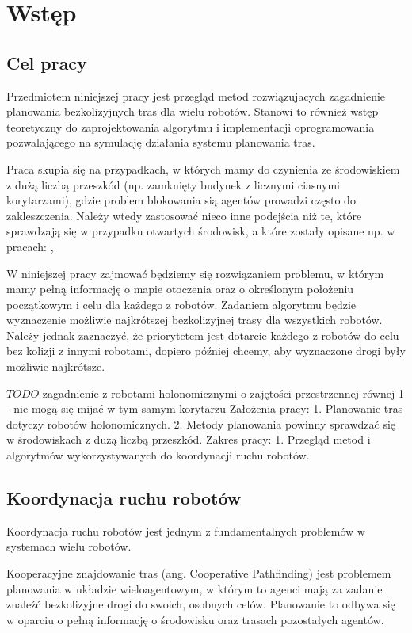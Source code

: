\chapter{Wstęp}
\label{ch:wstep}

\section{Cel pracy}
Przedmiotem niniejszej pracy jest przegląd metod rozwiązujacych zagadnienie planowania bezkolizyjnych tras dla wielu robotów. Stanowi to również wstęp teoretyczny do zaprojektowania algorytmu i implementacji oprogramowania pozwalającego na symulację działania systemu planowania tras.

Praca skupia się na przypadkach, w których mamy do czynienia ze środowiskiem z dużą liczbą przeszkód (np. zamknięty budynek z licznymi ciasnymi korytarzami), gdzie problem blokowania sią agentów prowadzi często do zakleszczenia. Należy wtedy zastosować nieco inne podejścia niż te, które sprawdzają się w przypadku otwartych środowisk, a które zostały opisane np. w pracach: \cite{roszkowska}, \cite{siemiatkowska}

W niniejszej pracy zajmować będziemy się rozwiązaniem problemu, w którym mamy pełną informację o mapie otoczenia oraz o określonym położeniu początkowym i celu dla każdego z robotów. Zadaniem algorytmu będzie wyznaczenie możliwie najkrótszej bezkolizyjnej trasy dla wszystkich robotów. Należy jednak zaznaczyć, że priorytetem jest dotarcie każdego z robotów do celu bez kolizji z innymi robotami, dopiero później chcemy, aby wyznaczone drogi były możliwie najkrótsze.

$TODO$ zagadnienie z robotami holonomicznymi o zajętości przestrzennej równej 1 - nie mogą się mijać w tym samym korytarzu
Założenia pracy:
1. Planowanie tras dotyczy robotów holonomicznych.
2. Metody planowania powinny sprawdzać się w środowiskach z dużą liczbą przeszkód.
Zakres pracy:
1. Przegląd metod i algorytmów wykorzystywanych do koordynacji ruchu robotów.


\section{Koordynacja ruchu robotów}
Koordynacja ruchu robotów jest jednym z fundamentalnych problemów w systemach wielu robotów. \cite{optpriorities}

Kooperacyjne znajdowanie tras (ang. Cooperative Pathfinding) jest problemem planowania w układzie wieloagentowym, w którym to agenci mają za zadanie znaleźć bezkolizyjne drogi do swoich, osobnych celów. Planowanie to odbywa się w oparciu o pełną informację o środowisku oraz trasach pozostałych agentów. \cite{cooppath}

